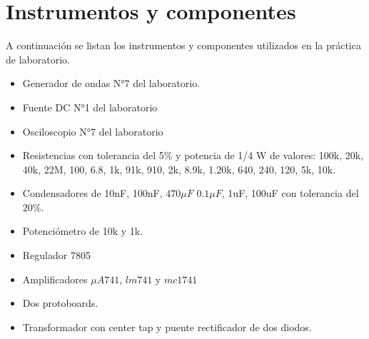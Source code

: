 \section{Instrumentos y componentes}

A continuación se listan los instrumentos y componentes utilizados en la práctica de laboratorio.

\begin{itemize}
    \item Generador de ondas N°7 del laboratorio. 
    \item Fuente DC N°1 del laboratorio
    \item Osciloscopio N°7 del laboratorio
    \item Resistencias con tolerancia del 5\% y potencia de 1/4 W de valores: 100k, 20k, 40k, 22M, 100, 6.8, 1k, 91k, 910, 2k, 8.9k, 1.20k, 640, 240, 120, 5k, 10k.
    \item Condensadores de 10nF, 100nF, $470\mu F$ $0.1 \mu F$, 1uF, 100uF con tolerancia del 20\%.
    \item Potenciómetro de 10k y 1k.
    \item Regulador 7805
    \item Amplificadores $\mu A741$, $lm741$ y $mc1741$
    \item Dos protoboards.
    \item Transformador con center tap y puente rectificador de dos diodos.
\end{itemize}